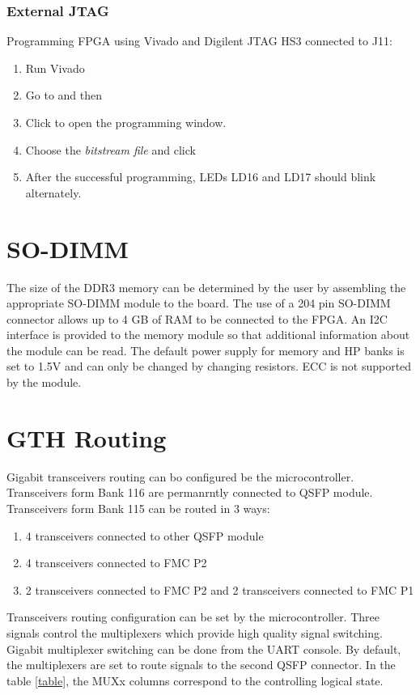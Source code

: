 \documentclass[12pt,oneside,a4]{article}
\begin{document}
\subsubsection{External JTAG}
Programming FPGA using Vivado and Digilent JTAG HS3 connected to J11:
\begin{enumerate}
		\item Run Vivado
		\item Go to  and then  
		\item Click  to open the programming window. 
		\item Choose the \textit{bitstream file} and click 

	\item After the successful programming, LEDs LD16 and LD17 should blink alternately.  
\end{enumerate}

\section{SO-DIMM}

The size of the DDR3 memory can be determined by the user by assembling the appropriate SO-DIMM module to the board. The use of a 204 pin SO-DIMM connector allows up to 4 GB of RAM to be connected to the FPGA. An I2C interface is provided to the memory module so that additional information about the module can be read. The default power supply for memory and HP banks is set to 1.5V and can only be changed by changing resistors. ECC is not supported by the module. 

\section{GTH Routing}
Gigabit transceivers routing can bo configured be the microcontroller. Transceivers form Bank 116 are permanrntly connected to QSFP module. Transceivers form Bank 115 can be routed in 3 ways:
\begin{enumerate}
    \item 4 transceivers connected to other QSFP module
    \item 4 transceivers connected to FMC P2
    \item 2 transceivers connected to FMC P2 and 2 transceivers connected to FMC P1
\end{enumerate}

Transceivers routing configuration can be set by the microcontroller. Three signals control the multiplexers which provide high quality signal switching. Gigabit multiplexer switching can be done from the UART console. By default, the multiplexers are set to route signals to the second QSFP connector. In the table \ref{table}, the MUXx columns correspond to the controlling logical state.
\end{document}
